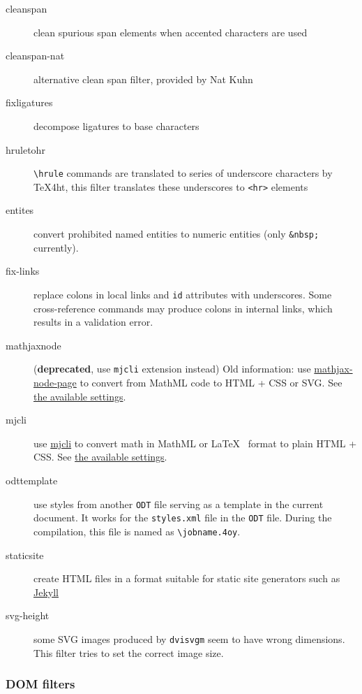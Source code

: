 \begin{description}
\item[cleanspan]
clean spurious span elements when accented characters are used
\item[cleanspan-nat]
alternative clean span filter, provided by Nat Kuhn
\item[fixligatures]
decompose ligatures to base characters
\item[hruletohr]
\texttt{\textbackslash{}hrule} commands are translated to series of
underscore characters by \TeX4ht, this filter translates these
underscores to \texttt{\textless{}hr\textgreater{}} elements
\item[entites]
convert prohibited named entities to numeric entities (only
\texttt{\&nbsp;} currently).
\item[fix-links]
replace colons in local links and \texttt{id} attributes with
underscores. Some cross-reference commands may produce colons in
internal links, which results in a validation error.
\item[mathjaxnode]
(\textbf{deprecated}, use \texttt{mjcli} extension instead) Old
information: use
\href{https://github.com/pkra/mathjax-node-page/}{mathjax-node-page} to
convert from MathML code to HTML + CSS or SVG. See
\protect\hyperlink{mathjaxsettings}{the available settings}.
\item[mjcli]
use \href{https://github.com/michal-h21/mjcli}{mjcli} to convert math in
MathML or \LaTeX~ format to plain HTML + CSS. See
\protect\hyperlink{mathjaxsettings}{the available settings}.
\item[odttemplate]
use styles from another \texttt{ODT} file serving as a template in the
current document. It works for the \texttt{styles.xml} file in the
\texttt{ODT} file. During the compilation, this file is named as
\texttt{\textbackslash{}jobname.4oy}. \label{sec:odttemplate}
\item[staticsite]
create HTML files in a format suitable for static site generators such
as \href{https://jekyllrb.com/}{Jekyll}
\item[svg-height]
some SVG images produced by \texttt{dvisvgm} seem to have wrong
dimensions. This filter tries to set the correct image size.
\end{description}

\hypertarget{dom-filters}{%
\subsubsection{DOM filters}\label{dom-filters}}

